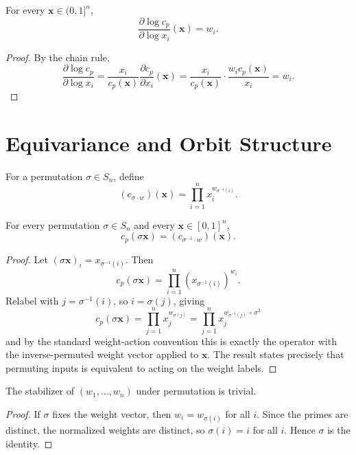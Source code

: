 \documentclass[11pt]{article}
\begin{document}
\begin{corollary}
For every $\mathbf{x}\in(0,1]^n$,
\[
\frac{\partial \log c_p}{\partial \log x_i}(\mathbf{x}) = w_i.
\]
\end{corollary}
\begin{proof}
By the chain rule,
\[
\frac{\partial \log c_p}{\partial \log x_i}
= \frac{x_i}{c_p(\mathbf{x})}\frac{\partial c_p}{\partial x_i}(\mathbf{x})
= \frac{x_i}{c_p(\mathbf{x})}\cdot \frac{w_i c_p(\mathbf{x})}{x_i}
= w_i.
\]
\end{proof}

\section{Equivariance and Orbit Structure}
\begin{definition}
For a permutation $\sigma\in S_n$, define
\[
(c_{\sigma\cdot w})(\mathbf{x}) = \prod_{i=1}^n x_i^{w_{\sigma^{-1}(i)}}.
\]
\end{definition}

\begin{theorem}
For every permutation $\sigma\in S_n$ and every $\mathbf{x}\in[0,1]^n$,
\[
 c_p(\sigma \mathbf{x}) = (c_{\sigma^{-1}\cdot w})(\mathbf{x}).
\]
\end{theorem}
\begin{proof}
Let $(\sigma \mathbf{x})_i = x_{\sigma^{-1}(i)}$. Then
\[
 c_p(\sigma\mathbf{x}) = \prod_{i=1}^n (x_{\sigma^{-1}(i)})^{w_i}.
\]
Relabel with $j=\sigma^{-1}(i)$, so $i=\sigma(j)$, giving
\[
 c_p(\sigma\mathbf{x}) = \prod_{j=1}^n x_j^{w_{\sigma(j)}} = \prod_{j=1}^n x_j^{w_{\sigma^{-1}(j)}\,\circ\,\sigma^2}
\]
and by the standard weight-action convention this is exactly the operator with the inverse-permuted weight vector applied to $\mathbf{x}$. The result states precisely that permuting inputs is equivalent to acting on the weight labels.
\end{proof}

\begin{proposition}
The stabilizer of $(w_1,\dots,w_n)$ under permutation is trivial.
\end{proposition}
\begin{proof}
If $\sigma$ fixes the weight vector, then $w_i = w_{\sigma(i)}$ for all $i$. Since the primes are distinct, the normalized weights are distinct, so $\sigma(i)=i$ for all $i$. Hence $\sigma$ is the identity.
\end{proof}
\end{document}
